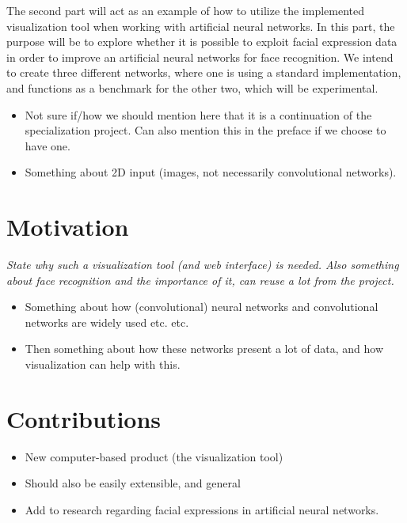 \noindent The second part will act as an example of how to utilize the implemented visualization tool when working with artificial neural networks. In this part, the purpose will be to explore whether it is possible to exploit facial expression data in order to improve an artificial neural networks for face recognition. We intend to create three different networks, where one is using a standard implementation, and functions as a benchmark for the other two, which will be experimental.

\begin{itemize}
    \item Not sure if/how we should mention here that it is a continuation of the specialization project. Can also mention this in the preface if we choose to have one.
    \item Something about 2D input (images, not necessarily convolutional networks).
\end{itemize}

\section{Motivation}

\textit{State why such a visualization tool (and web interface) is needed. Also something about face recognition and the importance of it, can reuse a lot from the project.}

\begin{itemize}
    \item Something about how (convolutional) neural networks and convolutional networks are widely used etc. etc.
    \item Then something about how these networks present a lot of data, and how visualization can help with this.
\end{itemize}

\section{Contributions}

\begin{itemize}
    \item New computer-based product (the visualization tool)
    \item Should also be easily extensible, and general
    \item Add to research regarding facial expressions in artificial neural networks.
\end{itemize}

